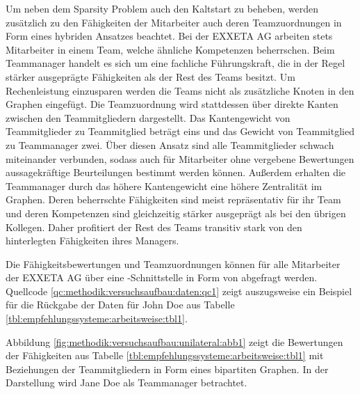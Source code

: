 Um neben dem Sparsity Problem auch den Kaltstart zu beheben, werden zusätzlich zu den Fähigkeiten der Mitarbeiter auch deren Teamzuordnungen in Form eines hybriden Ansatzes beachtet. Bei der EXXETA AG arbeiten stets Mitarbeiter in einem Team, welche ähnliche Kompetenzen beherrschen. Beim Teammanager handelt es sich um eine fachliche Führungskraft, die in der Regel stärker ausgeprägte Fähigkeiten als der Rest des Teams besitzt. Um Rechenleistung einzusparen werden die Teams nicht als zusätzliche Knoten in den Graphen eingefügt. Die Teamzuordnung wird stattdessen über direkte Kanten zwischen den Teammitgliedern dargestellt. Das Kantengewicht von Teammitglieder zu Teammitglied beträgt eins und das Gewicht von Teammitglied zu Teammanager zwei. Über diesen Ansatz sind alle Teammitglieder schwach miteinander verbunden, sodass auch für Mitarbeiter ohne vergebene Bewertungen aussagekräftige Beurteilungen bestimmt werden können. Außerdem erhalten die Teammanager durch das höhere Kantengewicht eine höhere Zentralität im Graphen. Deren beherrschte Fähigkeiten sind meist repräsentativ für ihr Team und deren Kompetenzen sind gleichzeitig stärker ausgeprägt als bei den übrigen Kollegen. Daher profitiert der Rest des Teams transitiv stark von den hinterlegten Fähigkeiten ihres Managers.

Die Fähigkeitsbewertungen und Teamzuordnungen können für alle Mitarbeiter der EXXETA AG über eine -Schnittstelle in Form von  abgefragt werden. Quellcode \ref{qc:methodik:versuchsaufbau:daten:qc1} zeigt auszugsweise ein Beispiel für die Rückgabe der Daten für John Doe aus Tabelle \ref{tbl:empfehlungssysteme:arbeitsweise:tbl1}.

Abbildung \ref{fig:methodik:versuchsaufbau:unilateral:abb1} zeigt die Bewertungen der Fähigkeiten aus Tabelle \ref{tbl:empfehlungssysteme:arbeitsweise:tbl1} mit Beziehungen der Teammitgliedern in Form eines bipartiten Graphen. In der Darstellung wird Jane Doe als Teammanager betrachtet.

